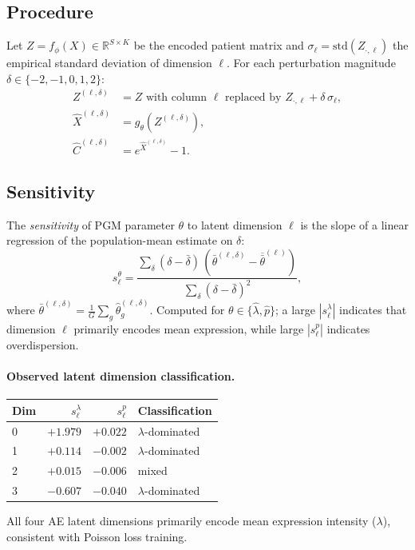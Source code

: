 \documentclass[11pt,a4paper]{article}
\newcommand{\R}{\mathbb{R}}
\theoremstyle{definition}
\begin{document}
\subsection{Procedure}

Let $Z = f_\phi(X) \in \R^{S \times K}$ be the encoded patient matrix and
$\sigma_\ell = \mathrm{std}(Z_{\cdot,\ell})$ the empirical standard deviation
of dimension $\ell$.  For each perturbation magnitude
$\delta \in \{-2, -1, 0, 1, 2\}$:
\begin{align}
  Z^{(\ell,\delta)} &= Z \text{ with column } \ell \text{ replaced by }
                       Z_{\cdot,\ell} + \delta\,\sigma_\ell,\\
  \hat{X}^{(\ell,\delta)} &= g_\theta(Z^{(\ell,\delta)}),\\
  \hat{C}^{(\ell,\delta)} &= e^{\hat{X}^{(\ell,\delta)}} - 1.
\end{align}

\subsection{Sensitivity}

The \emph{sensitivity} of PGM parameter $\theta$ to latent dimension
$\ell$ is the slope of a linear regression of the population-mean estimate
on $\delta$:
\begin{equation}
  s_\ell^\theta = \frac{
    \sum_\delta (\delta - \bar\delta)\,
    (\bar\theta^{(\ell,\delta)} - \overline{\bar\theta}^{(\ell)})
  }{
    \sum_\delta (\delta - \bar\delta)^2
  },
\end{equation}
where $\bar\theta^{(\ell,\delta)} = \frac{1}{G}\sum_g \hat\theta_g^{(\ell,\delta)}$.
Computed for $\theta \in \{\hat\lambda, \hat{p}\}$; a large $|s_\ell^\lambda|$
indicates that dimension $\ell$ primarily encodes mean expression, while
large $|s_\ell^p|$ indicates overdispersion.

\paragraph{Observed latent dimension classification.}
\begin{center}
\begin{tabular}{lrrl}
\toprule
Dim & $s_\ell^\lambda$ & $s_\ell^p$ & Classification\\
\midrule
0 & $+1.979$ & $+0.022$ & $\lambda$-dominated\\
1 & $+0.114$ & $-0.002$ & $\lambda$-dominated\\
2 & $+0.015$ & $-0.006$ & mixed\\
3 & $-0.607$ & $-0.040$ & $\lambda$-dominated\\
\bottomrule
\end{tabular}
\end{center}
All four AE latent dimensions primarily encode mean expression intensity
($\lambda$), consistent with Poisson loss training.
\end{document}
